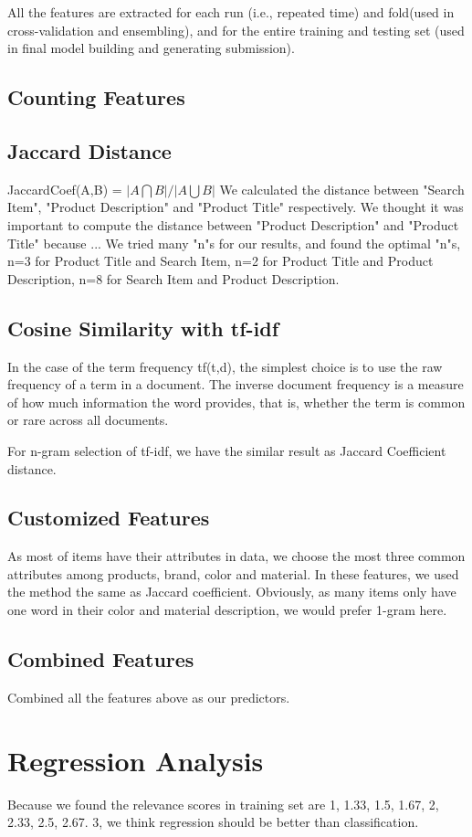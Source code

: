 \documentclass[journal]{IEEEtran}
\begin{document}
All the features are extracted for each run (i.e., repeated time) and fold(used in cross-validation and ensembling), and for the entire training and testing set (used in final model building and generating submission).
\subsection{Counting Features}
\subsection{Jaccard Distance}
JaccardCoef(A,B) = $|A\bigcap B|/|A\bigcup B|$
We calculated the distance between "Search Item", "Product Description" and "Product Title" respectively. We thought it was important to compute the distance between "Product Description" and "Product Title" because ...
We tried many "n"s for our results, and found the optimal "n"s, n=3 for Product Title and Search Item, n=2 for Product Title and Product Description, n=8 for Search Item and Product Description.
\subsection{Cosine Similarity with tf-idf}
In the case of the term frequency tf(t,d), the simplest choice is to use the raw frequency of a term in a document. The inverse document frequency is a measure of how much information the word provides, that is, whether the term is common or rare across all documents.

For n-gram selection of tf-idf, we have the similar result as Jaccard Coefficient distance.
\subsection{Customized Features}
As most of items have their attributes in data, we choose the most three common attributes among products, brand, color and material. In these features, we used the method the same as Jaccard coefficient. Obviously, as many items only have one word in their color and material description, we would prefer 1-gram here.
\subsection{Combined Features}
Combined all the features above as our predictors.
\section{Regression Analysis}
Because we found the relevance scores in training set are 1, 1.33, 1.5, 1.67, 2, 2.33, 2.5, 2.67. 3, we think regression should be better than classification.
\end{document}
